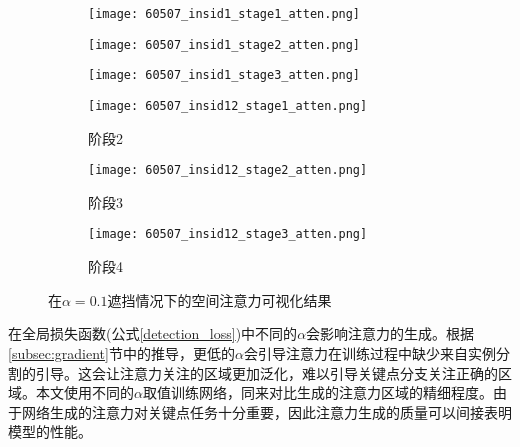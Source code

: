 \begin{figure}[h]
	\centering
	\begin{minipage}{\textwidth}
		\centering
		\begin{subfigure}{0.23\linewidth}
			\texttt{[image: 60507\_insid1\_stage1\_atten.png]}
		\end{subfigure}
		\begin{subfigure}{0.23\linewidth}
			\texttt{[image: 60507\_insid1\_stage2\_atten.png]}
		\end{subfigure}
		\begin{subfigure}{0.23\linewidth}
			\texttt{[image: 60507\_insid1\_stage3\_atten.png]}
		\end{subfigure}
	\end{minipage}
	
	\vskip2pt
	\begin{minipage}{\textwidth}
		\centering
		\begin{subfigure}{0.23\linewidth}
			\texttt{[image: 60507\_insid12\_stage1\_atten.png]}
			\caption{阶段2}
		\end{subfigure}
		\begin{subfigure}{0.23\linewidth}
			\texttt{[image: 60507\_insid12\_stage2\_atten.png]}
			\caption{阶段3}
		\end{subfigure}
		\begin{subfigure}{0.23\linewidth}
			\texttt{[image: 60507\_insid12\_stage3\_atten.png]}
			\caption{阶段4}
		\end{subfigure}
	\end{minipage}
	\caption{在$\alpha=0.1$遮挡情况下的空间注意力可视化结果}
	\label{fig:attenvis}
\end{figure}

在全局损失函数(公式\eqref{detection_loss})中不同的$\alpha$会影响注意力的生成。根据\ref{subsec:gradient}节中的推导，更低的$\alpha$会引导注意力在训练过程中缺少来自实例分割的引导。这会让注意力关注的区域更加泛化，难以引导关键点分支关注正确的区域。本文使用不同的$\alpha$取值训练网络，同来对比生成的注意力区域的精细程度。由于网络生成的注意力对关键点任务十分重要，因此注意力生成的质量可以间接表明模型的性能。


